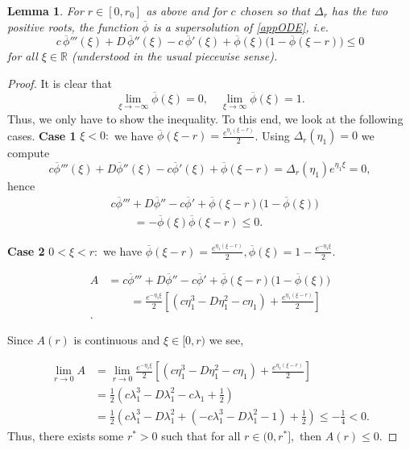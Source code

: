 \documentclass[12pt,letterpaper]{amsart}
\newtheorem{lemma}[theorem]{Lemma}
\theoremstyle{definition}
\theoremstyle{remark}
\numberwithin{equation}{section}
\begin{document}
 \begin{lemma}\label{lem:super}
 	For $r\in[0,r_0]$ as above and for $c$ chosen so that $\Delta_r$ has the two positive roots, the function $\overline\phi$ is a supersolution of \eqref{appODE}, i.e.
 	\[
 	c\,\overline\phi'''(\xi) + D\,\overline\phi''(\xi) - c\,\overline\phi'(\xi) + \overline\phi(\xi)\bigl(1-\overline\phi(\xi-r)\bigr)\le 0
 	\]
 	for all $\xi\in\mathbb R$ (understood in the usual piecewise sense).
 \end{lemma}
 
 \begin{proof}
 It is clear that 
 \[\lim_{\xi\to -\infty}\overline\phi(\xi)=0, \quad \lim_{\xi\to \infty}\overline\phi(\xi)=1.\]
 Thus, we only have to show the inequality. To this end, we look at the following cases. 
 \textbf{Case 1}	
 $\xi<0:$ we have $\overline\phi(\xi-r)=\frac{e^{\eta_1(\xi-r)}}{2}$. Using $\Delta_r(\eta_1)=0$ we compute
 	\[
 	c\overline\phi'''(\xi) + D\overline\phi''(\xi) - c\overline\phi'(\xi) +\overline\phi(\xi-r) = \Delta_r(\eta_1)e^{\eta_1\xi}=0,
 	\]
 	hence
 	\[
 	\begin{split}
 		&c\overline\phi''' + D\overline\phi'' - c\overline\phi' + \overline\phi(\xi-r)\bigl(1-\overline\phi(\xi)\bigr)\\
 		&\qquad= -\overline\phi(\xi)\overline\phi(\xi-r)\le 0.
 	\end{split}
 	\]

 \textbf{Case 2}	
 $0<\xi<r:$ we have $\overline\phi(\xi-r)=\frac{e^{\eta_1(\xi-r)}}{2},\overline\phi(\xi)=1-\frac{e^{-\eta_1\xi}}{2}. $

 	\[
 	\begin{split}
 		A&=c\overline\phi''' + D\overline\phi'' - c\overline\phi' + \overline\phi(\xi-r)\bigl(1-\overline\phi(\xi)\bigr)\\
 		&\qquad=\frac{e^{-\eta_1 \xi}}{2} \left[ \left(c\eta_1^3 - D\eta_1^2 - c\eta_1 \right)  +\frac{e^{\eta_1(\xi - r)}}{2}\right] \\ .
 	\end{split}
 	\]

Since $A(r)$ is continuous and $\xi\in[0,r)$ we see,

	\[
 	\begin{split}
 		\lim_{r\to 0} A&=\lim_{r\to 0}  \frac{e^{-\eta_1 \xi}}{2} \left[ \left(c\eta_1^3 - D\eta_1^2 - c\eta_1 \right)  +\frac{e^{\eta_1(\xi - r)}}{2}\right]\\
        &=\frac{1}{2}\left(c\lambda_1^3 - D\lambda_1^2 - c\lambda_1 +\frac{1}{2}\right)\\
        &=\frac{1}{2}\left(c\lambda_1^3 - D\lambda_1^2+\left(-c\lambda_1^3-D\lambda_1^2-1\right)+\frac{1}{2}\right)\leq-\frac{1}{4}<0.
 	\end{split}
 	\]
    Thus, there exists some $r^*>0$ such that for all $r\in(0,r^*],$ then $A(r)\le 0.$


\end{proof}
\end{document}
